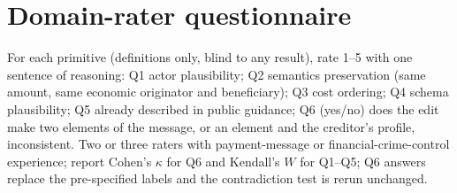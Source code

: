 \documentclass[conference]{IEEEtran}
\begin{document}
\section{Domain-rater questionnaire}
For each primitive (definitions only, blind to any result), rate 1--5 with
one sentence of reasoning: Q1 actor plausibility; Q2 semantics preservation
(same amount, same economic originator and beneficiary); Q3 cost ordering;
Q4 schema plausibility; Q5 already described in public guidance; Q6 (yes/no)
does the edit make two elements of the message, or an element and the
creditor's profile, inconsistent. Two or three raters with payment-message
or financial-crime-control experience; report Cohen's $\kappa$ for Q6 and
Kendall's $W$ for Q1--Q5; Q6 answers replace the pre-specified labels and
the contradiction test is rerun unchanged.
\end{document}
